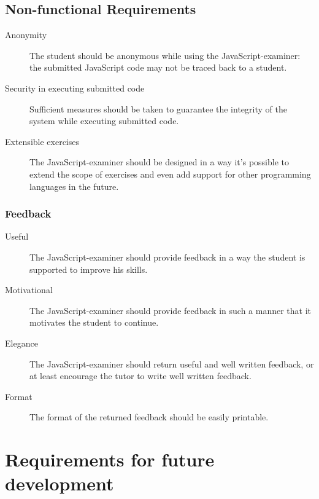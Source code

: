 \subsection{Non-functional Requirements}
\begin{description}
  \item[Anonymity] The student should be anonymous while using the
    JavaScript-examiner: the submitted JavaScript code may not be traced back
    to a student.
  \item[Security in executing submitted code] Sufficient measures should be
    taken to guarantee the integrity of the system while executing submitted
    code.
  \item[Extensible exercises] The JavaScript-examiner should be designed in a
    way it's possible to extend the scope of exercises and even add support for
    other programming languages in the future. 
\end{description}

\subsubsection{Feedback}
\begin{description}
  \item[Useful] The JavaScript-examiner should provide feedback in a way
    the student is supported to improve his skills.
  \item[Motivational] The JavaScript-examiner should provide feedback in such a
    manner that it motivates the student to continue.
  \item[Elegance] The JavaScript-examiner should return useful and well written 
    feedback, or at least encourage the tutor to write well written feedback.
  \item[Format] The format of the returned feedback should be easily printable.
\end{description}

\section{Requirements for future development}
